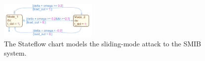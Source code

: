 


%


\begin{figure}[t!]%
	\centering%
    \includegraphics[width=0.42\textwidth]{image/smib_attack_model}%
		\vspace{-1em}
	\caption{The Stateflow chart models the sliding-mode attack to the SMIB system.}%
	\vspace{-1em}
\end{figure}%


